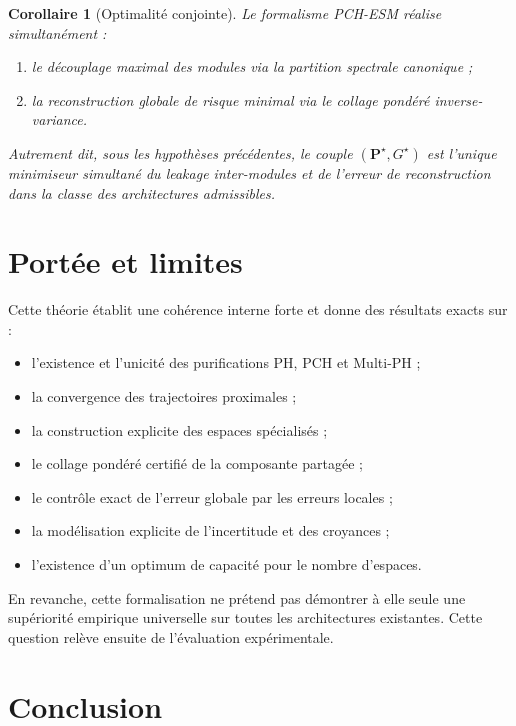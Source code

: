 \documentclass[11pt,a4paper]{article}
\newtheorem{corollary}{Corollaire}[section]
\newcommand{\1}{\mathbf 1}
\begin{document}
\begin{corollary}[Optimalité conjointe]
Le formalisme PCH-ESM réalise simultanément :
\begin{enumerate}[leftmargin=2em]
    \item le découplage maximal des modules via la partition spectrale canonique ;
    \item la reconstruction globale de risque minimal via le collage pondéré inverse-variance.
\end{enumerate}
Autrement dit, sous les hypothèses précédentes, le couple \((\mathbf P^\star,G^\star)\) est l'unique minimiseur simultané du leakage inter-modules et de l'erreur de reconstruction dans la classe des architectures admissibles.
\end{corollary}


\section{Portée et limites}

Cette théorie établit une cohérence interne forte et donne des résultats exacts sur :
\begin{itemize}[leftmargin=2em]
    \item l'existence et l'unicité des purifications PH, PCH et Multi-PH ;
    \item la convergence des trajectoires proximales ;
    \item la construction explicite des espaces spécialisés ;
    \item le collage pondéré certifié de la composante partagée ;
    \item le contrôle exact de l'erreur globale par les erreurs locales ;
    \item la modélisation explicite de l'incertitude et des croyances ;
    \item l'existence d'un optimum de capacité pour le nombre d'espaces.
\end{itemize}

En revanche, cette formalisation ne prétend pas démontrer à elle seule une supériorité empirique universelle sur toutes les architectures existantes.  
Cette question relève ensuite de l'évaluation expérimentale.


\section{Conclusion}
\end{document}
